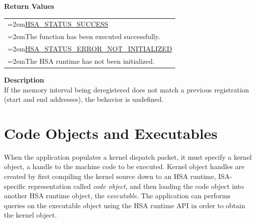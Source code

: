 \documentclass[final,oneside]{book}
\begin{document}
\vspace{-2mm}\textbf{Return Values}\\[-7mm]
\noindent\begin{longtable}{@{}>{\hangindent=2em}p{\linewidth}}
\hyperlink{group__status_1ggad755322e7ff95456520e8abdbe90d225ae382ea0c9c05cce5a60d0317375159cc}{HSA_\-STATUS_\-SUCCESS}\\\hspace{2em}The function has been executed successfully.\\[2mm]
\hyperlink{group__status_1ggad755322e7ff95456520e8abdbe90d225a34ea59ade5bfce95eee935238a99f5b5}{HSA_\-STATUS_\-ERROR_\-NOT_\-INITIALIZED}\\\hspace{2em}The HSA runtime has not been initialized.
\end{longtable}
\vspace{-2mm}\noindent\textbf{Description}\\
If the memory interval being deregistered does not match a previous registration (start and end addresses), the behavior is undefined. 
 


\section{Code Objects and Executables}\label{sec:codeobjects}

When the application populates a kernel dispatch packet, it must specify a
kernel object, a handle to the machine code to be executed. Kernel object
handles are created by first compiling the kernel source down to an HSA runtime,
ISA-specific representation called \textit{code object}, and then loading the
code object into another HSA runtime object, the \textit{executable}. The
application can performs queries on the executable object using the HSA runtime
API in order to obtain the kernel object.
\end{document}

